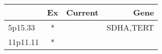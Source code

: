 \begin{tabular}{lccr}
\toprule
{} & Ex & Current &       Gene \\
\midrule
5p15.33  &  * &         &  SDHA,TERT \\
11p11.11 &  * &         &            \\
\bottomrule
\end{tabular}
